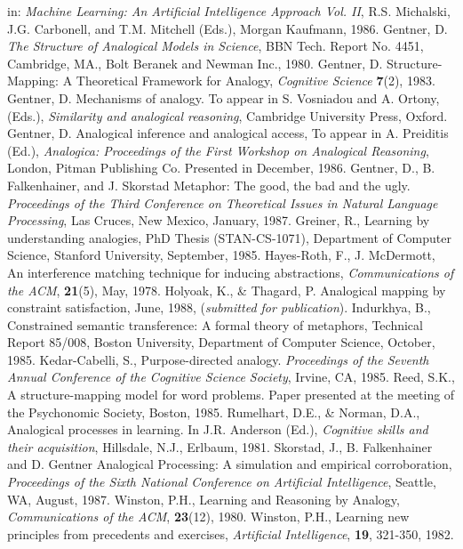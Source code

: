 \begin{thebibliography}{99}
in: {\it Machine Learning: An Artificial Intelligence Approach Vol. II}, R.S. Michalski,
J.G. Carbonell, and T.M. Mitchell (Eds.), Morgan Kaufmann, 1986.
Gentner, D.
{\it The Structure of Analogical Models in Science}, BBN Tech.
Report No. 4451, Cambridge, MA., Bolt Beranek and Newman Inc., 1980.
Gentner, D.
Structure-Mapping: A Theoretical Framework for Analogy, {\it Cognitive
Science} {\bf 7}(2), 1983. 
Gentner, D.
Mechanisms of analogy.  To appear in S. Vosniadou and A. Ortony, (Eds.),
{\em Similarity and analogical reasoning}, Cambridge University Press,
Oxford.
Gentner, D.
Analogical inference and analogical access, To appear in A. Preiditis (Ed.),
{\em Analogica: Proceedings of the First Workshop on Analogical Reasoning},
London, Pitman Publishing Co.  Presented in December, 1986.
Gentner, D., B. Falkenhainer, and J. Skorstad
Metaphor: The good, the bad and the ugly. {\it Proceedings of the Third
Conference on Theoretical Issues in Natural Language Processing}, Las
Cruces, New Mexico, January, 1987.  
Greiner, R., Learning by understanding analogies, PhD Thesis (STAN-CS-1071),
Department of Computer Science, Stanford University, September, 1985.
Hayes-Roth, F., J. McDermott, An interference matching technique for
inducing abstractions, {\it Communications of the ACM}, {\bf 21}(5),
May, 1978.
Holyoak, K., \& Thagard, P. Analogical mapping by constraint satisfaction,
June, 1988, ({\it submitted for publication}).
Indurkhya, B., Constrained semantic transference: A formal theory of
metaphors, Technical Report 85/008, Boston University, Department of
Computer Science, October, 1985.
Kedar-Cabelli, S., Purpose-directed analogy. {\it Proceedings of the Seventh
Annual Conference of the Cognitive Science Society}, Irvine, CA, 1985.
Reed, S.K., A structure-mapping model for word problems. Paper presented
at the meeting of the Psychonomic Society, Boston, 1985.
Rumelhart, D.E., \& Norman, D.A., Analogical processes in learning.  In J.R.
Anderson (Ed.), {\it Cognitive skills and their acquisition}, Hillsdale,
N.J., Erlbaum, 1981.
Skorstad, J., B. Falkenhainer and D. Gentner
Analogical Processing: A simulation and empirical corroboration, {\it
Proceedings of the Sixth National Conference on Artificial Intelligence},
Seattle, WA, August, 1987.
Winston, P.H., Learning and Reasoning by Analogy, {\it Communications of the
ACM}, {\bf 23}(12), 1980.
Winston, P.H., Learning new principles from precedents and exercises,
{\it Artificial Intelligence}, {\bf 19}, 321-350, 1982.

\end{thebibliography}

